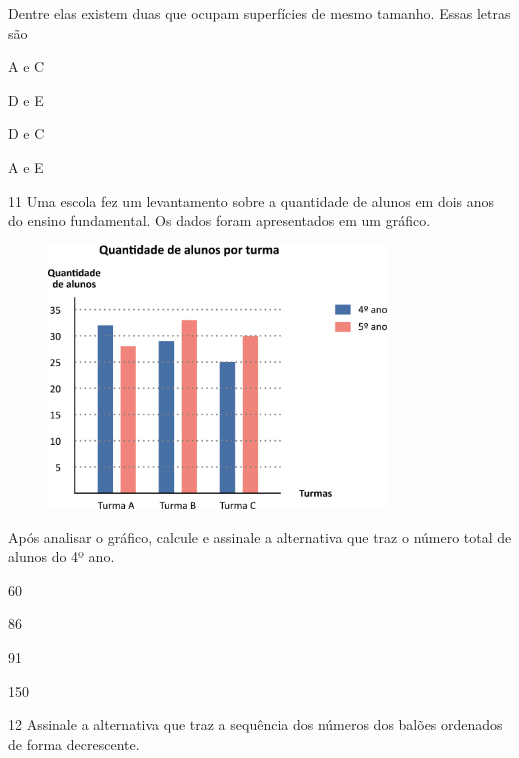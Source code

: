 Dentre elas existem duas que ocupam superfícies de mesmo tamanho. Essas letras são

\begin{escolha}
\item
  A e C
\item
  D e E
\item
  D e C
\item
  A e E
\end{escolha}

\num{11} Uma escola fez um levantamento sobre a quantidade de alunos em dois anos
do ensino fundamental. Os dados foram apresentados em um gráfico.

\begin{figure}[htpb!]
\centering
\includegraphics[width=0.8\textwidth]{./media/image97.png}
\end{figure}

Após analisar o gráfico, calcule e assinale a alternativa que traz o número total de alunos do 4º ano.

\begin{multicols}{2}
\begin{escolha}
\item
  60
\item
  86
\item
  91
\item
  150
\end{escolha}
\end{multicols}

\pagebreak

\num{12} Assinale a alternativa que traz a sequência dos números dos balões ordenados de forma decrescente.

